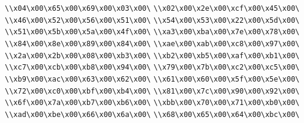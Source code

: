 \verb|\\x04\x00\x65\x00\x69\x00\x03\x00\|\newline
\verb|\\x02\x00\x2e\x00\xcf\x00\x45\x00\|\newline
\verb|\\x46\x00\x52\x00\x56\x00\x51\x00\|\newline
\verb|\\x54\x00\x53\x00\x22\x00\x5d\x00\|\newline
\verb|\\x51\x00\x5b\x00\x5a\x00\x4f\x00\|\newline
\verb|\\xa3\x00\xba\x00\x7e\x00\x78\x00\|\newline
\verb|\\x84\x00\x8e\x00\x89\x00\x84\x00\|\newline
\verb|\\xae\x00\xab\x00\xc8\x00\x97\x00\|\newline
\verb|\\x2a\x00\x2b\x00\x08\x00\xb3\x00\|\newline
\verb|\\xb2\x00\xb5\x00\xaf\x00\xb1\x00\|\newline
\verb|\\xc7\x00\xcb\x00\xb8\x00\x94\x00\|\newline
\verb|\\x79\x00\x7b\x00\xc2\x00\xc5\x00\|\newline
\verb|\\xb9\x00\xac\x00\x63\x00\x62\x00\|\newline
\verb|\\x61\x00\x60\x00\x5f\x00\x5e\x00\|\newline
\verb|\\x72\x00\xc0\x00\xbf\x00\xb4\x00\|\newline
\verb|\\x81\x00\x7c\x00\x90\x00\x92\x00\|\newline
\verb|\\x6f\x00\x7a\x00\xb7\x00\xb6\x00\|\newline
\verb|\\xbb\x00\x70\x00\x71\x00\xb0\x00\|\newline
\verb|\\xad\x00\xbe\x00\x66\x00\x6a\x00\|\newline
\verb|\\x68\x00\x65\x00\x64\x00\xbc\x00\|\newline
